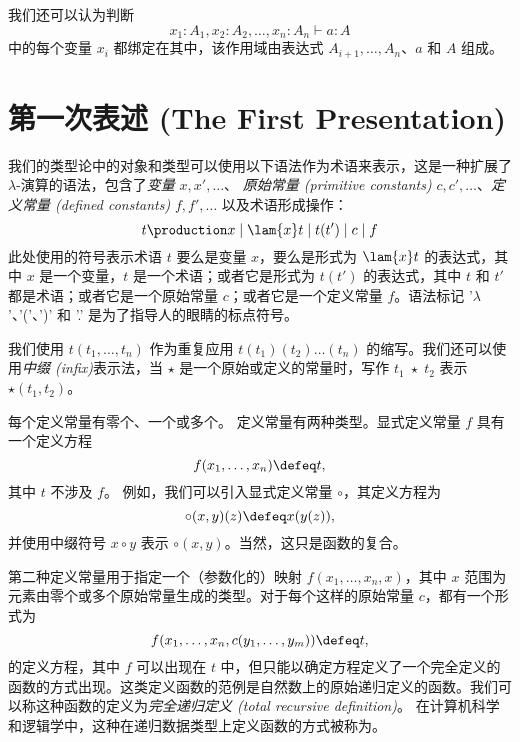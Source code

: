 我们还可以认为判断
\[
  x_1:A_1, x_2:A_2,\dots,x_n:A_n \vdash a : A
\]
中的每个变量 $x_i$ 都绑定在其中，该作用域由表达式 $A_{i+1}, \ldots, A_n$、$a$ 和 $A$ 组成。
\section{第一次表述 (The First Presentation)}
\label{sec:syntax-informally}

我们的类型论中的对象和类型可以使用以下语法作为术语来表示，这是一种扩展了$\lambda$-演算的语法，包含了\emph{变量} $x, x',\dots$、
%
\emph{原始常量 (primitive constants)}
%
%
$c,c',\dots$、\emph{定义常量 (defined constants)} $f,f',\dots$ 以及术语形成操作：
%
\[
  t \production x \mid \lam{x} t \mid t(t') \mid c \mid f
\]
%
此处使用的符号表示术语 $t$ 要么是变量 $x$，要么是形式为 $\lam{x} t$ 的表达式，其中 $x$ 是一个变量，$t$ 是一个术语；或者它是形式为 $t(t')$ 的表达式，其中 $t$ 和 $t'$ 都是术语；或者它是一个原始常量 $c$；或者它是一个定义常量 $f$。语法标记 '$\lambda$'、'('、')' 和 '.' 是为了指导人的眼睛的标点符号。

我们使用 $t(t_1,\dots,t_n)$ 作为重复应用 $t(t_1)(t_2)\dots (t_n)$ 的缩写。我们还可以使用\emph{中缀 (infix)}表示法，当 $\star$ 是一个原始或定义的常量时，写作 $t_1\;\star\;t_2$ 表示 $\star(t_1,t_2)$。

每个定义常量有零个、一个或多个。
%
%
定义常量有两种类型。显式定义常量 $f$ 具有一个定义方程
\[ f(x_1,\dots,x_n)\defeq t,\]
其中 $t$ 不涉及 $f$。
%
例如，我们可以引入显式定义常量 $\circ$，其定义方程为
\[ \circ (x,y)(z) \defeq x(y(z)),\]
并使用中缀符号 $x\circ y$ 表示 $\circ(x,y)$。当然，这只是函数的复合。

第二种定义常量用于指定一个（参数化的）映射 $f(x_1,\dots,x_n,x)$，其中 $x$ 范围为元素由零个或多个原始常量生成的类型。对于每个这样的原始常量 $c$，都有一个形式为
\[
  f(x_1,\dots,x_n,c(y_1,\dots,y_m)) \defeq t,
\]
的定义方程，其中 $f$ 可以出现在 $t$ 中，但只能以确定方程定义了一个完全定义的函数的方式出现。这类定义函数的范例是自然数上的原始递归定义的函数。我们可以称这种函数的定义为\emph{完全递归定义 (total recursive definition)}。
%
在计算机科学和逻辑学中，这种在递归数据类型上定义函数的方式被称为。
%
%
%

